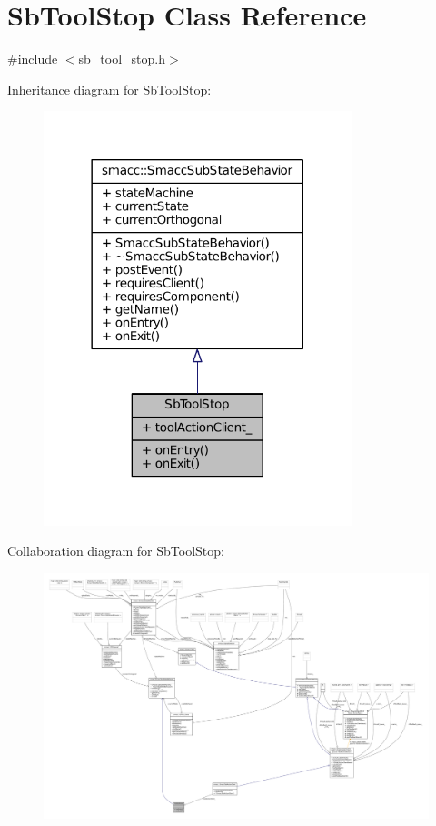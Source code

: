 \hypertarget{classSbToolStop}{}\section{Sb\+Tool\+Stop Class Reference}
\label{classSbToolStop}


{\ttfamily \#include $<$sb\+\_\+tool\+\_\+stop.\+h$>$}



Inheritance diagram for Sb\+Tool\+Stop\+:
\nopagebreak
\begin{figure}[H]
\begin{center}
\leavevmode
\includegraphics[width=254pt]{classSbToolStop__inherit__graph}
\end{center}
\end{figure}


Collaboration diagram for Sb\+Tool\+Stop\+:
\nopagebreak
\begin{figure}[H]
\begin{center}
\leavevmode
\includegraphics[width=350pt]{classSbToolStop__coll__graph}
\end{center}
\end{figure}
